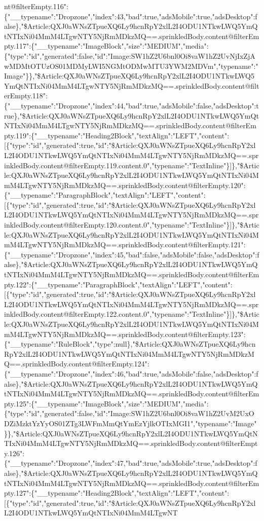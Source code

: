 nt@filterEmpty.116":\{"\_\_typename":"Dropzone","index":43,"bad":true,"adsMobile":true,"adsDesktop":false\},"\$Article:QXJ0aWNsZTpueXQ6Ly9hcnRpY2xlL2I4ODU1NTkwLWQ5YmQtNTIxNi04MmM4LTgwNTY5NjRmMDkzMQ==.sprinkledBody.content@filterEmpty.117":\{"\_\_typename":"ImageBlock","size":"MEDIUM","media":\{"type":"id","generated":false,"id":"Image:SW1hZ2U6bnl0Oi8vaW1hZ2UvNjIxZjAwMDMtOTUzOS01MDMyLWI5NGMtODMwMTU3YWM2MDVm","typename":"Image"\}\},"\$Article:QXJ0aWNsZTpueXQ6Ly9hcnRpY2xlL2I4ODU1NTkwLWQ5YmQtNTIxNi04MmM4LTgwNTY5NjRmMDkzMQ==.sprinkledBody.content@filterEmpty.118":\{"\_\_typename":"Dropzone","index":44,"bad":true,"adsMobile":false,"adsDesktop":true\},"\$Article:QXJ0aWNsZTpueXQ6Ly9hcnRpY2xlL2I4ODU1NTkwLWQ5YmQtNTIxNi04MmM4LTgwNTY5NjRmMDkzMQ==.sprinkledBody.content@filterEmpty.119":\{"\_\_typename":"Heading2Block","textAlign":"LEFT","content":{[}\{"type":"id","generated":true,"id":"\$Article:QXJ0aWNsZTpueXQ6Ly9hcnRpY2xlL2I4ODU1NTkwLWQ5YmQtNTIxNi04MmM4LTgwNTY5NjRmMDkzMQ==.sprinkledBody.content@filterEmpty.119.content.0","typename":"TextInline"\}{]}\},"\$Article:QXJ0aWNsZTpueXQ6Ly9hcnRpY2xlL2I4ODU1NTkwLWQ5YmQtNTIxNi04MmM4LTgwNTY5NjRmMDkzMQ==.sprinkledBody.content@filterEmpty.120":\{"\_\_typename":"ParagraphBlock","textAlign":"LEFT","content":{[}\{"type":"id","generated":true,"id":"\$Article:QXJ0aWNsZTpueXQ6Ly9hcnRpY2xlL2I4ODU1NTkwLWQ5YmQtNTIxNi04MmM4LTgwNTY5NjRmMDkzMQ==.sprinkledBody.content@filterEmpty.120.content.0","typename":"TextInline"\}{]}\},"\$Article:QXJ0aWNsZTpueXQ6Ly9hcnRpY2xlL2I4ODU1NTkwLWQ5YmQtNTIxNi04MmM4LTgwNTY5NjRmMDkzMQ==.sprinkledBody.content@filterEmpty.121":\{"\_\_typename":"Dropzone","index":45,"bad":false,"adsMobile":false,"adsDesktop":false\},"\$Article:QXJ0aWNsZTpueXQ6Ly9hcnRpY2xlL2I4ODU1NTkwLWQ5YmQtNTIxNi04MmM4LTgwNTY5NjRmMDkzMQ==.sprinkledBody.content@filterEmpty.122":\{"\_\_typename":"ParagraphBlock","textAlign":"LEFT","content":{[}\{"type":"id","generated":true,"id":"\$Article:QXJ0aWNsZTpueXQ6Ly9hcnRpY2xlL2I4ODU1NTkwLWQ5YmQtNTIxNi04MmM4LTgwNTY5NjRmMDkzMQ==.sprinkledBody.content@filterEmpty.122.content.0","typename":"TextInline"\}{]}\},"\$Article:QXJ0aWNsZTpueXQ6Ly9hcnRpY2xlL2I4ODU1NTkwLWQ5YmQtNTIxNi04MmM4LTgwNTY5NjRmMDkzMQ==.sprinkledBody.content@filterEmpty.123":\{"\_\_typename":"RuleBlock","type":null\},"\$Article:QXJ0aWNsZTpueXQ6Ly9hcnRpY2xlL2I4ODU1NTkwLWQ5YmQtNTIxNi04MmM4LTgwNTY5NjRmMDkzMQ==.sprinkledBody.content@filterEmpty.124":\{"\_\_typename":"Dropzone","index":46,"bad":true,"adsMobile":false,"adsDesktop":false\},"\$Article:QXJ0aWNsZTpueXQ6Ly9hcnRpY2xlL2I4ODU1NTkwLWQ5YmQtNTIxNi04MmM4LTgwNTY5NjRmMDkzMQ==.sprinkledBody.content@filterEmpty.125":\{"\_\_typename":"ImageBlock","size":"MEDIUM","media":\{"type":"id","generated":false,"id":"Image:SW1hZ2U6bnl0Oi8vaW1hZ2UvM2UxODZiMzktYzYyOS01ZTg3LWFmMmQtYmEzYjlkOTIxMGI1","typename":"Image"\}\},"\$Article:QXJ0aWNsZTpueXQ6Ly9hcnRpY2xlL2I4ODU1NTkwLWQ5YmQtNTIxNi04MmM4LTgwNTY5NjRmMDkzMQ==.sprinkledBody.content@filterEmpty.126":\{"\_\_typename":"Dropzone","index":47,"bad":true,"adsMobile":true,"adsDesktop":false\},"\$Article:QXJ0aWNsZTpueXQ6Ly9hcnRpY2xlL2I4ODU1NTkwLWQ5YmQtNTIxNi04MmM4LTgwNTY5NjRmMDkzMQ==.sprinkledBody.content@filterEmpty.127":\{"\_\_typename":"Heading2Block","textAlign":"LEFT","content":{[}\{"type":"id","generated":true,"id":"\$Article:QXJ0aWNsZTpueXQ6Ly9hcnRpY2xlL2I4ODU1NTkwLWQ5YmQtNTIxNi04MmM4LTgwNT